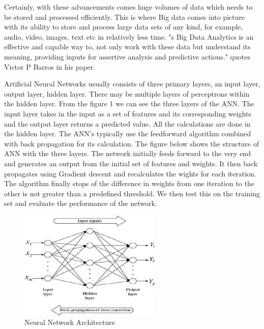 \documentclass[sigconf]{acmart}
\begin{document}
Certainly, with these advancements comes huge volumes of data which needs to be stored and processed efficiently. This is where Big data comes into picture with its ability to store and process large data sets of any kind, for example, audio, video, images, text etc in relatively less time. "s Big Data Analytics is an effective and capable way to, not only work with these data but understand its meaning, providing inputs for assertive analysis and predictive actions."\cite{Barros2016} quotes Victor P Barros in his paper.

Artificial Neural Networks usually consists of three primary layers, an input layer, output layer, hidden layer. There may be multiple layers of perceptrons within the hidden layer. From the figure 1 we can see the three layers of the ANN. The input layer takes in the input as a set of features and its corresponding weights and the output layer returns a predicted value. All the calculations are done in the hidden layer. The ANN's typically use the feedforward algorithm combined with back propagation for its calculation. The figure below shows the structure of ANN with the three layers. The network initially feeds forward to the very end and generates an output from the initial set of features and weights. It then back propagates using Gradient descent and recalculates the wights for each iteration. The algorithm finally stops of the difference in weights from one iteration to the other is not greater than a predefined threshold. We then test this on the training set and evaluate the performance of the network.

\begin{figure}[htp]
    \includegraphics[width=1.0\columnwidth]{images/images.jpg}
    \caption{Neural Network Architecture \cite{google}}
    \label{fig:figure1}
\end{figure}
\end{document}
